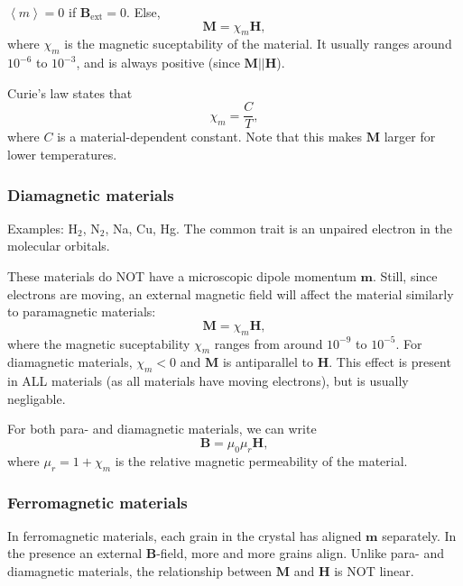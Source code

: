 \documentclass[a4paper, 12pt]{article}
\renewcommand{\vec}[1]{\bm{#1}}
\newcommand{\B}{\ensuremath{\vec{B}}}
\renewcommand{\H}{\ensuremath{\vec{H}}}
\begin{document}
            $\left<m\right>=0$ if $\B_{\text{ext}} = 0$. Else, 
            \begin{equation}
                \vec{M} = \chi_m\H,
            \end{equation}
            where $\chi_m$ is the magnetic suceptability of the material. 
            It usually ranges around $10^{-6}$ to $10^{-3}$, and is always positive (since $\vec{M} || \H$).

            Curie's law states that 
            \begin{equation}
                \chi_m = \frac{C}{T}, 
            \end{equation}
            where $C$ is a material-dependent constant. Note that this makes $\vec{M}$ larger for lower temperatures.

        \subsubsection{Diamagnetic materials}
            Examples: $\text{H}_2$, $\text{N}_2$, Na, Cu, Hg. The common trait is an unpaired electron in the molecular orbitals.
            
            These materials do NOT have a microscopic dipole momentum $\vec{m}$. Still, since electrons are moving, 
            an external magnetic field will affect the material similarly to paramagnetic materials:
            \begin{equation}
                \vec{M} = \chi_m\H,
            \end{equation}
            where the magnetic suceptability $\chi_m$ ranges from around $10^{-9}$ to $10^{-5}$. 
            For diamagnetic materials, $\chi_m < 0$ and $\vec{M}$ is antiparallel to \H. 
            This effect is present in ALL materials (as all materials have moving electrons), but is usually negligable.
        
        For both para- and diamagnetic materials, we can write
        \begin{equation}
            \B = \mu_0 \mu_r \H,
        \end{equation}
        where $\mu_r = 1+\chi_m$ is the relative magnetic permeability of the material.
        
        \subsubsection{Ferromagnetic materials}
            In ferromagnetic materials, each grain in the crystal has aligned $\vec{m}$ separately. 
            In the presence an external \B-field, more and more grains align. 
            Unlike para- and diamagnetic materials, the relationship between $\vec{M}$ and \H{} is NOT linear.
\end{document}
